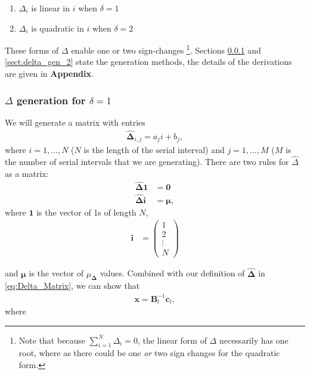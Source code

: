 \documentclass[10pt,journal,compsoc]{IEEEtran}
\begin{document}
\begin{enumerate}
    \item $\Delta_i$ is linear in $i$ when  $\delta=1$
    \item $\Delta_i$ is quadratic in $i$ when $\delta=2$
\end{enumerate}
These forms of $\Delta$ enable one or two sign-changes \footnote{Note that because $\sum_{i=1}^N \Delta_i=0$, the linear form of $\Delta$ necessarily has one root, where as there could be one \textit{or} two sign changes for the quadratic form.}. Sections \ref{sect:delta_gen_1} and \ref{sect:delta_gen_2} state the generation methods, the details of the derivations are given in \textbf{Appendix}.

\subsubsection{$\Delta$ generation for $\delta=1$}\label{sect:delta_gen_1}

We will generate a matrix with entries
\begin{align}\label{eq:Delta_Matrix}
 \boldsymbol{\hat{\Delta}}_{i, j} = a_ji+b_j,
\end{align}
 where $i=1, \ldots, N$ ($N$ is the length of the serial interval) and $j = 1, \ldots , M$ ($M$ is the number of serial intervals that we are generating). There are two rules for $\hat{\Delta}$ as a matrix:
\begin{align}
    \boldsymbol{\hat{\Delta} 1} &= \boldsymbol{0}\label{eq:cons_of_prob_1}\\
    \boldsymbol{\hat{\Delta} i} &= \boldsymbol{\mu}\label{eq:mean_1},
\end{align}
where $\boldsymbol{1}$ is the vector of 1s of length $N$,
\begin{align}
    \boldsymbol{i} &= \begin{pmatrix}
           1 \\
           2 \\
           \vdots \\
           N
         \end{pmatrix}
  \end{align}
  
  and $\boldsymbol{\mu}$ is the vector of $\mu_\boldsymbol{\Delta}$ values. Combined with our definition of $\boldsymbol{\hat{\Delta}}$ in \ref{eq:Delta_Matrix}, we can show that
  \begin{align*}
      \boldsymbol{x} = \boldsymbol{B}_l^{-1}\boldsymbol{c}_l,
  \end{align*}
where
\end{document}
